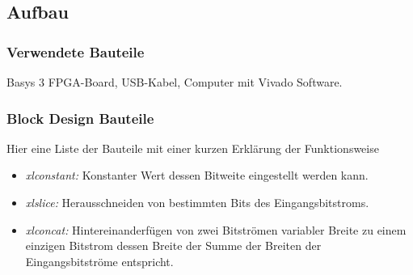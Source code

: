 \documentclass[11pt, a4paper]{article}
\begin{document}
\subsection*{Aufbau}
\subsubsection*{Verwendete Bauteile}
Basys 3 FPGA-Board, USB-Kabel, Computer mit Vivado Software.
\subsubsection*{Block Design Bauteile}
Hier eine Liste der Bauteile mit einer kurzen Erklärung der Funktionsweise
\begin{itemize}
	\item \textit{xlconstant:} Konstanter Wert dessen Bitweite eingestellt werden kann.
	\item \textit{xlslice:} Herausschneiden von bestimmten Bits des Eingangsbitstroms.
	\item \textit{xlconcat:} Hintereinanderfügen von zwei Bitströmen variabler Breite zu einem einzigen Bitstrom dessen Breite der Summe der Breiten der Eingangsbitströme entspricht.
\end{itemize}
\end{document}
